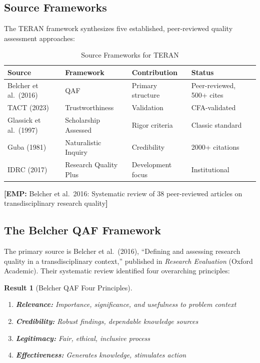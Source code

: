 \documentclass[11pt,a4paper]{article}
\newcommand{\tagEMP}[1]{\textcolor{empgreen}{\textbf{[EMP:} #1\textbf{]}}}
\newtheorem{result}{Result}[section]
\begin{document}
\subsection{Source Frameworks}

The TERAN framework synthesizes five established, peer-reviewed quality assessment approaches:

\begin{table}[h]
\centering
\caption{Source Frameworks for TERAN}
\label{tab:sources}
\begin{tabular}{p{3.5cm}p{4cm}p{3cm}p{3cm}}
\toprule
\textbf{Source} & \textbf{Framework} & \textbf{Contribution} & \textbf{Status} \\
\midrule
Belcher et al.\ (2016) & QAF & Primary structure & Peer-reviewed, 500+ cites \\
TACT (2023) & Trustworthiness & Validation & CFA-validated \\
Glassick et al.\ (1997) & Scholarship Assessed & Rigor criteria & Classic standard \\
Guba (1981) & Naturalistic Inquiry & Credibility & 2000+ citations \\
IDRC (2017) & Research Quality Plus & Development focus & Institutional \\
\bottomrule
\end{tabular}
\end{table}

\tagEMP{Belcher et al.\ 2016: Systematic review of 38 peer-reviewed articles on transdisciplinary research quality}

\subsection{The Belcher QAF Framework}

The primary source is Belcher et al.\ (2016), ``Defining and assessing research quality in a transdisciplinary context,'' published in \emph{Research Evaluation} (Oxford Academic). Their systematic review identified four overarching principles:

\begin{result}[Belcher QAF Four Principles]
\label{res:belcher}
\begin{enumerate}
    \item \textbf{Relevance:} Importance, significance, and usefulness to problem context
    \item \textbf{Credibility:} Robust findings, dependable knowledge sources
    \item \textbf{Legitimacy:} Fair, ethical, inclusive process
    \item \textbf{Effectiveness:} Generates knowledge, stimulates action
\end{enumerate}
\end{result}
\end{document}
